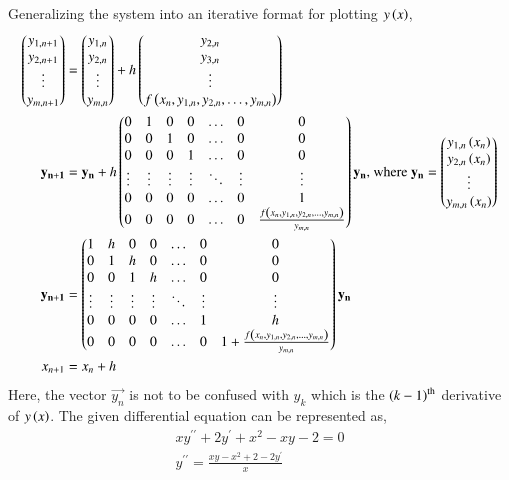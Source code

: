 \documentclass[journal]{IEEEtran}
\begin{document}
Generalizing the system into an iterative format for plotting $y\left(x\right)$,
\begin{align}
    \begin{pmatrix}y_{1, n + 1}\\y_{2, n + 1}\\\vdots\\y_{m, n + 1}\end{pmatrix} &= \begin{pmatrix}y_{1, n}\\y_{2, n}\\\vdots\\y_{m, n}\end{pmatrix} + h\begin{pmatrix}y_{2, n}\\y_{3, n}\\\vdots\\f\left(x_n, y_{1, n}, y_{2, n}, \dots, y_{m, n}\right)\end{pmatrix}\\
    \mathbf{y_{n + 1}} &= \mathbf{y_{n}} + h\begin{pmatrix}0 & 1 & 0 & 0 & \dots & 0 & 0\\ 0 & 0 & 1 & 0 & \dots & 0 & 0\\0 & 0 & 0 & 1 & \dots & 0 & 0\\\vdots & \vdots & \vdots & \vdots & \ddots & \vdots & \vdots\\ 0 & 0 & 0 & 0 & \dots & 0 & 1\\0 & 0 & 0 & 0 & \dots & 0 & \frac{f\left(x_n, y_{1, n}, y_{2, n}, \dots, y_{m, n}\right)}{y_{m, n}}\end{pmatrix}\mathbf{y_n} \text{, where } \mathbf{y_n} = \begin{pmatrix}y_{1, n}\left(x_n\right)\\y_{2, n}\left(x_n\right)\\\vdots\\y_{m, n}\left(x_n\right)\end{pmatrix}\\
    \mathbf{y_{n + 1}} &= \begin{pmatrix}1 & h & 0 & 0 & \dots & 0 & 0\\ 0 & 1 & h & 0 & \dots & 0 & 0\\0 & 0 & 1 & h & \dots & 0 & 0\\\vdots & \vdots & \vdots & \vdots& \ddots & \vdots & \vdots\\ 0 & 0 & 0 & 0 & \dots & 1 & h\\0 & 0 & 0 & 0 & \dots & 0 & 1+\frac{f\left(x_n, y_{1, n}, y_{2, n}, \dots, y_{m, n}\right)}{y_{m, n}}\end{pmatrix}\mathbf{y_n}\\
    x_{n + 1} &= x_{n} + h
\end{align}
Here, the vector $\vec{y_n}$ is not to be confused with $y_k$ which is the $\left(k - 1\right)^{\text{th}}$ derivative of $y\left(x\right)$.
\newline
The given differential equation can be represented as,
\begin{align}
    xy^{\prime\prime} +2y^{\prime} +x^2 -xy-2=0\\
    y^{\prime\prime} = \frac{xy-x^2+2-2y^{\prime}}{x}
\end{align}
\end{document}

